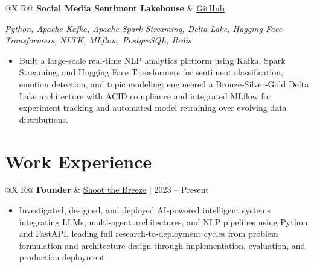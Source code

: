 \documentclass[a4paper,10pt]{article}
\newcommand{\ulink}[2]{\href{#1}{\uline{#2}}}
\newcommand{\subheading}[1]{{\color[HTML]{0A0A0A}\fontsize{12}{14}\selectfont\bfseries #1}}
\newcommand{\techstack}[1]{{\color[HTML]{5C5C5C}\fontsize{10.5}{12.5}\selectfont\itshape #1}}
\newcommand{\meta}[1]{{\color[HTML]{5C5C5C}\fontsize{10.5}{12.5}\selectfont #1}}
\begin{document}
\vspace{5pt}

\begin{tabularx}{\linewidth}{@{}X R@{}}
  \subheading{Social Media Sentiment Lakehouse} &
  \meta{\ulink{https://github.com/su-jin1425/Social-Media-Sentiment-Lakehouse}{GitHub}}
\end{tabularx}
\vspace{1pt}
\techstack{Python, Apache Kafka, Apache Spark Streaming, Delta Lake, Hugging Face Transformers, NLTK, MLflow, PostgreSQL, Redis}
\begin{itemize}[nosep, leftmargin=1.5em, itemsep=2pt, topsep=3pt]
  \item {\color[HTML]{0A0A0A}\fontsize{11}{15}\selectfont Built a large-scale real-time NLP analytics platform using Kafka, Spark Streaming, and Hugging Face Transformers for sentiment classification, emotion detection, and topic modeling; engineered a Bronze-Silver-Gold Delta Lake architecture with ACID compliance and integrated MLflow for experiment tracking and automated model retraining over evolving data distributions.}
\end{itemize}

\vspace{3pt}

\section{Work Experience}
\vspace{3pt}

\begin{tabularx}{\linewidth}{@{}X R@{}}
  \subheading{Founder} &
  \meta{\ulink{https://shoot-the-breeze.vercel.app}{Shoot the Breeze} $|$ 2023 -- Present}
\end{tabularx}
\begin{itemize}[nosep, leftmargin=1.5em, itemsep=2pt, topsep=3pt]
  \item {\color[HTML]{0A0A0A}\fontsize{11}{15}\selectfont Investigated, designed, and deployed AI-powered intelligent systems integrating LLMs, multi-agent architectures, and NLP pipelines using Python and FastAPI, leading full research-to-deployment cycles from problem formulation and architecture design through implementation, evaluation, and production deployment.}
\end{itemize}

\vspace{5pt}
\end{document}
